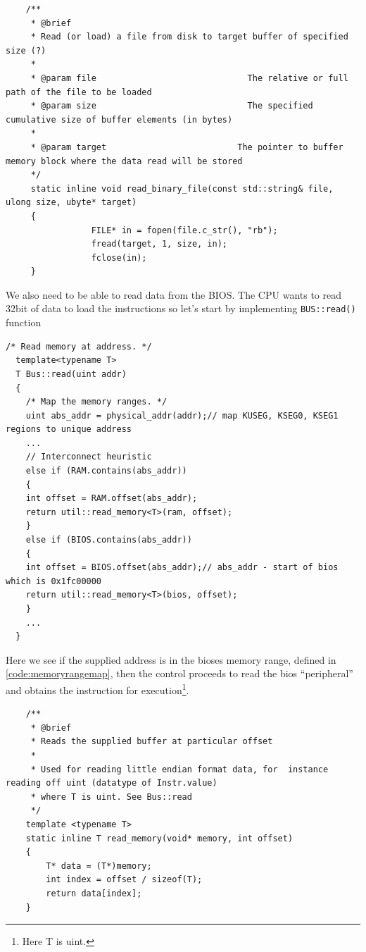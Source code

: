 \documentclass[a4paper]{article}
\newcommand{\code}[1] {\texttt{#1}}
\begin{document}
\begin{lstlisting}
    /**
     * @brief
     * Read (or load) a file from disk to target buffer of specified size (?)
     *
     * @param file                              The relative or full path of the file to be loaded
     * @param size                              The specified cumulative size of buffer elements (in bytes)
     *
     * @param target                          The pointer to buffer memory block where the data read will be stored
     */
     static inline void read_binary_file(const std::string& file, ulong size, ubyte* target)
     {
	             FILE* in = fopen(file.c_str(), "rb");
	             fread(target, 1, size, in);
	             fclose(in);
     }
\end{lstlisting}

We also need to be able to read data from the BIOS. The CPU wants to
read 32bit of data to load the instructions so let's start by
implementing \code{BUS::read()} function

\begin{lstlisting}[caption={Interconnect implementation for reading}, label={code:interconnectbusread}]
  /* Read memory at address. */
  template<typename T>
  T Bus::read(uint addr)
  {
    /* Map the memory ranges. */
    uint abs_addr = physical_addr(addr);// map KUSEG, KSEG0, KSEG1 regions to unique address
    ...
    // Interconnect heuristic
    else if (RAM.contains(abs_addr))
    {
	int offset = RAM.offset(abs_addr);
	return util::read_memory<T>(ram, offset);
    }
    else if (BIOS.contains(abs_addr))
    {   
	int offset = BIOS.offset(abs_addr);// abs_addr - start of bios which is 0x1fc00000
	return util::read_memory<T>(bios, offset);
    }
    ...  
  }
\end{lstlisting}

Here we see if the supplied address is in the bioses memory range, defined in \ref{code:memoryrangemap},
then the control proceeds to read the bios ``peripheral'' and obtains the instruction for execution\footnote{Here
T is uint.}.

\begin{lstlisting}
    /**
     * @brief
     * Reads the supplied buffer at particular offset
     *
     * Used for reading little endian format data, for  instance reading off uint (datatype of Instr.value)
     * where T is uint. See Bus::read
     */
	template <typename T>
	static inline T read_memory(void* memory, int offset)
	{
		T* data = (T*)memory;
		int index = offset / sizeof(T);
		return data[index];
	}
\end{lstlisting}
\end{document}

